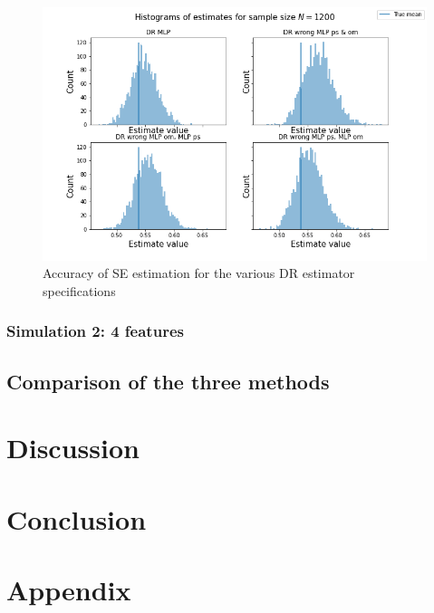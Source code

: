 \documentclass[12pt,twoside]{article}
\begin{document}
\begin{figure}[h!]
    \centering
    \includegraphics[width = 0.9\columnwidth]{figures/histMLP.png}
    \caption{Accuracy of \citet{lunceford_davidian} SE estimation for the various DR estimator specifications}
    \label{fighistMLP}
\end{figure}

\clearpage
\subsubsection{Simulation 2: 4 features}

\subsection{Comparison of the three methods}

\clearpage
\section{Discussion}

\section{Conclusion}

\section{Appendix}
\clearpage


\end{document}
